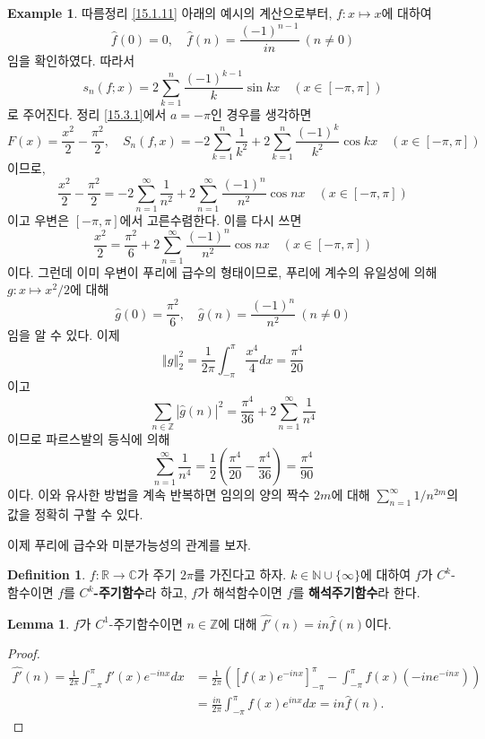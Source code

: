 \documentclass[11pt]{book}
\numberwithin{equation}{chapter}
\def\NN{\mathbb{N}}
\def\ZZ{\mathbb{Z}}
\def\RR{\mathbb{R}}
\def\CC{\mathbb{C}}
\newcommand{\abs}[1]{\left\vert#1\right\vert}
\newcommand{\norm}[1]{\left\Vert#1\right\Vert}
\newcommand{\paren}[1]{\left(#1\right)}
\newcommand{\sqbracket}[1]{\left[#1\right]}
\theoremstyle{definition}
\newtheorem{lem}[thm]{Lemma}
\newtheorem{defn}[thm]{Definition}
\newtheorem*{ex}{Example}
\begin{document}
\begin{ex}
    따름정리 \ref{15.1.11} 아래의 예시의 계산으로부터, \(f : x \mapsto x\)에 대하여
    \[
        \hat{f}(0) =  0, \quad \hat{f}(n) = \frac{(-1)^{n-1}}{in} \ (n \ne 0)
    \]
    임을 확인하였다. 따라서
    \[
        s_n(f; x) = 2 \sum_{k=1}^n \frac{(-1)^{k-1}}{k} \sin kx \quad (x \in [-\pi, \pi])
    \]
    로 주어진다. 정리 \ref{15.3.1}에서 \(a = -\pi\)인 경우를 생각하면
    \[
        F(x) = \frac{x^2}{2} - \frac{\pi^2}{2}, \quad S_n(f, x) = -2 \sum_{k=1}^n \frac{1}{k^2} + 2 \sum_{k=1}^n \frac{(-1)^k}{k^2} \cos kx  \quad (x \in [-\pi, \pi])
    \]
    이므로,
    \[
        \frac{x^2}{2} - \frac{\pi^2}{2} = -2 \sum_{n=1}^\infty \frac{1}{n^2} + 2 \sum_{n=1}^\infty \frac{(-1)^n}{n^2} \cos nx  \quad (x \in [-\pi, \pi])
    \]
    이고 우변은 \([-\pi, \pi]\)에서 고른수렴한다. 이를 다시 쓰면
    \[
        \frac{x^2}{2} = \frac{\pi^2}{6} + 2 \sum_{n=1}^\infty \frac{(-1)^n}{n^2} \cos nx  \quad (x \in [-\pi, \pi])
    \]
    이다. 그런데 이미 우변이 푸리에 급수의 형태이므로, 푸리에 계수의 유일성에 의해 \(g : x \mapsto x^2/2\)에 대해
    \[
        \hat{g}(0) = \frac{\pi^2}{6}, \quad \hat{g}(n) = \frac{(-1)^n}{n^2} \ (n \ne 0)
    \]
    임을 알 수 있다. 이제
    \[
        \norm{g}_2^2 = \frac{1}{2\pi} \int_{-\pi}^\pi \frac{x^4}{4} dx = \frac{\pi^4}{20}
    \]
    이고
    \[
        \sum_{n \in \ZZ} \abs{\hat{g}(n)}^2 = \frac{\pi^4}{36} + 2 \sum_{n=1}^\infty \frac{1}{n^4}
    \]
    이므로 파르스발의 등식에 의해
    \[
        \sum_{n=1}^\infty \frac{1}{n^4} = \frac{1}{2} \paren{\frac{\pi^4}{20} - \frac{\pi^4}{36}} = \frac{\pi^4}{90}
    \]
    이다. 이와 유사한 방법을 계속 반복하면 임의의 양의 짝수 \(2m\)에 대해 \(\sum_{n=1}^\infty 1/n^{2m}\)의 값을 정확히 구할 수 있다.
\end{ex}

이제 푸리에 급수와 미분가능성의 관계를 보자.

\begin{defn}
    \(f : \RR \to \CC\)가 주기 \(2\pi\)를 가진다고 하자. \(k \in \NN \cup \{\infty\}\)에 대하여 \(f\)가 \(C^k\)-함수이면 \(f\)를 \textbf{\(C^k\)-주기함수}라 하고, \(f\)가 해석함수이면 \(f\)를 \textbf{해석주기함수}라 한다.
\end{defn}

\begin{lem}
    \(f\)가 \(C^1\)-주기함수이면 \(n \in \ZZ\)에 대해 \(\widehat{f'}(n) = in \hat{f}(n)\)이다.
    \begin{proof}
        \begin{align*}
            \widehat{f'}(n) = \frac{1}{2\pi} \int_{-\pi}^\pi f'(x) e^{-inx} dx &= \frac{1}{2\pi} \paren{\sqbracket{f(x) e^{-inx}}_{-\pi}^\pi - \int_{-\pi}^\pi f(x)(-ine^{-inx})}\\
            &= \frac{in}{2\pi} \int_{-\pi}^\pi f(x) e^{inx} dx = in \hat{f}(n).
        \end{align*}
    \end{proof}
\end{lem}
\end{document}
